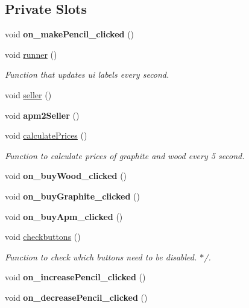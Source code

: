 \subsection*{Private Slots}
\begin{DoxyCompactItemize}
\item 
\mbox{\label{classMainWindow_a01b6ff5f83460855e5125c0a77a4018d}} 
void {\bfseries on\+\_\+make\+Pencil\+\_\+clicked} ()
\item 
\mbox{\label{classMainWindow_ae82d6db3dd5e52b5e5038b5356fd5ff9}} 
void \hyperlink{classMainWindow_ae82d6db3dd5e52b5e5038b5356fd5ff9}{runner} ()
\begin{DoxyCompactList}\small\item\em Function that updates ui labels every second. \end{DoxyCompactList}\item 
void \hyperlink{classMainWindow_a4dc23fc3239af6ef699297e092f833cd}{seller} ()
\item 
\mbox{\label{classMainWindow_af88e0bdbc0edab9e04408b3b07419add}} 
void {\bfseries apm2\+Seller} ()
\item 
\mbox{\label{classMainWindow_abbb5a286404d3bf211caa780c5a8a89e}} 
void \hyperlink{classMainWindow_abbb5a286404d3bf211caa780c5a8a89e}{calculate\+Prices} ()
\begin{DoxyCompactList}\small\item\em Function to calculate prices of graphite and wood every 5 second. \end{DoxyCompactList}\item 
\mbox{\label{classMainWindow_ac1ccd307bacd96f814bc13e5c9307937}} 
void {\bfseries on\+\_\+buy\+Wood\+\_\+clicked} ()
\item 
\mbox{\label{classMainWindow_a60acb5ba769483317adf8a1ad8c9af27}} 
void {\bfseries on\+\_\+buy\+Graphite\+\_\+clicked} ()
\item 
\mbox{\label{classMainWindow_acf4255896c256da2f20bf64dfc8eb38e}} 
void {\bfseries on\+\_\+buy\+Apm\+\_\+clicked} ()
\item 
void \hyperlink{classMainWindow_a8d78bab624841d0cab89e03c7c3c1a61}{checkbuttons} ()
\begin{DoxyCompactList}\small\item\em Function to check which buttons need to be disabled. $\ast$/. \end{DoxyCompactList}\item 
\mbox{\label{classMainWindow_afce8692f1f157355e429ffae9ea94f38}} 
void {\bfseries on\+\_\+increase\+Pencil\+\_\+clicked} ()
\item 
\mbox{\label{classMainWindow_a5e1710322c48fb39fd18109e4d8df1a0}} 
void {\bfseries on\+\_\+decrease\+Pencil\+\_\+clicked} ()
\end{DoxyCompactItemize}

